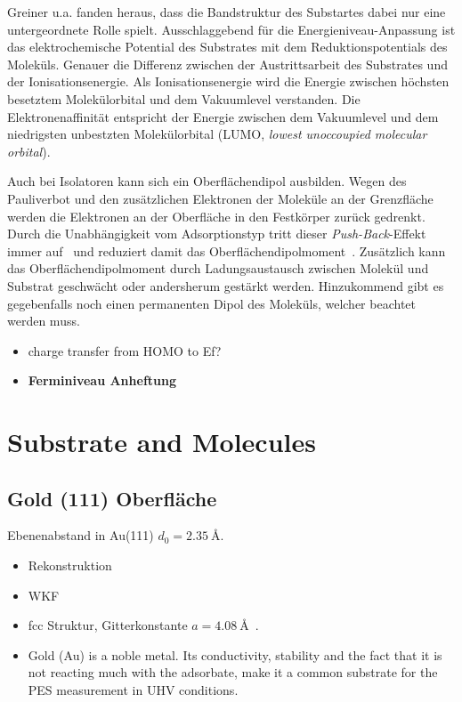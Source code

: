             Greiner u.a. \cite{IF_3} fanden heraus, dass die Bandstruktur des Substartes dabei nur eine untergeordnete Rolle spielt.
            Ausschlaggebend für die Energieniveau-Anpassung ist das elektrochemische Potential des Substrates mit dem Reduktionspotentials des Moleküls.
            Genauer die Differenz zwischen der Austrittsarbeit des Substrates und der Ionisationsenergie.
            Als Ionisationsenergie wird die Energie zwischen höchsten besetztem Molekülorbital und dem Vakuumlevel verstanden.
            Die Elektronenaffinität entspricht der Energie zwischen dem Vakuumlevel und dem niedrigsten unbestzten Molekülorbital (LUMO, \textit{lowest unoccoupied molecular orbital}).

            Auch bei Isolatoren kann sich ein Oberflächendipol ausbilden.
            Wegen des Pauliverbot und den zusätzlichen Elektronen der Moleküle an der Grenzfläche werden die Elektronen an der Oberfläche in den Festkörper zurück gedrenkt.
            Durch die Unabhängigkeit vom Adsorptionstyp tritt dieser \textit{Push-Back}-Effekt immer auf~\cite{IF_4} und reduziert damit das Oberflächendipolmoment~\cite{IF_1}.
            Zusätzlich kann das Oberflächendipolmoment durch Ladungsaustausch zwischen Molekül und Substrat geschwächt oder andersherum gestärkt werden.
            Hinzukommend gibt es gegebenfalls noch einen permanenten Dipol des Moleküls, welcher beachtet werden muss.

            \begin{itemize}
                \item charge transfer from HOMO to Ef? \cite{IF_4}
                \item \textbf{Ferminiveau Anheftung}
            \end{itemize}


    \section{Substrate and Molecules}
        \subsection{Gold (111) Oberfläche}
            \textbf{\cite{5A_1}}
            Ebenenabstand in Au(111) $d_0 = \SI{2.35}{\angstrom}$.

            \begin{itemize}
                \item Rekonstruktion
                \item WKF
                \item fcc Struktur, Gitterkonstante  $a=\SI{4.08}{\angstrom}$~\cite{Marx}.
                \item Gold (Au) is a noble metal. Its conductivity, stability and the fact that it is not reacting much with the adsorbate, make it a common substrate for the PES measurement in UHV conditions.
            \end{itemize}



